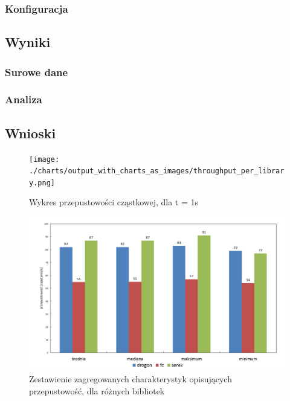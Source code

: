 \documentclass[12pt]{article}
\begin{document}
{{			{
				\subsubsection{Konfiguracja}
			}
		}

		{
			\subsection{Wyniki}

			{
				\subsubsection{Surowe dane}
			}

			{
				\subsubsection{Analiza}
			}
		}

		{
			\subsection{Wnioski}
		}
	}

	\newpage

	{
		\begin{figure}[H]
			\centering
			\texttt{[image: ./charts/output\_with\_charts\_as\_images/throughput\_per\_library.png]}
			\caption{Wykres przepustowości cząstkowej, dla \Delta t  = 1s}
			\medskip
		\end{figure}
	}

	{
		\begin{figure}[H]
			\centering
			\includegraphics[width=15cm,keepaspectratio=true]{./charts/pre_generated_charts/throughput_summary_per_library_summary.png}
			\caption{Zestawienie zagregowanych charakterystyk opisujących przepustowość, dla różnych bibliotek}
			\medskip
		\end{figure}
	}
\end{document}
